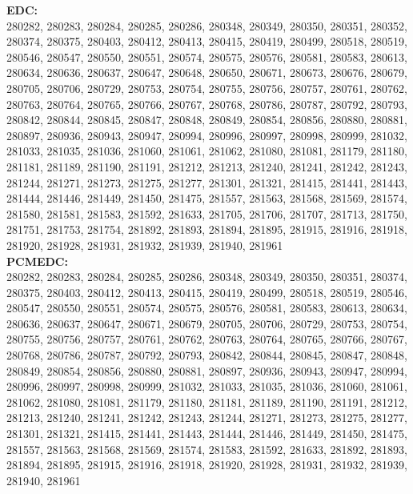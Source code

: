  \textbf{EDC:}\\
280282, 280283, 280284, 280285, 280286, 280348, 280349, 280350, 280351, 280352, 280374, 280375, 280403, 280412, 280413, 280415, 280419, 280499, 280518, 280519, 280546, 280547, 280550, 280551, 280574, 280575, 280576, 280581, 280583, 280613, 280634, 280636, 280637, 280647, 280648, 280650, 280671, 280673, 280676, 280679, 280705, 280706, 280729, 280753, 280754, 280755, 280756, 280757, 280761, 280762, 280763, 280764, 280765, 280766, 280767, 280768, 280786, 280787, 280792, 280793, 280842, 280844, 280845, 280847, 280848, 280849, 280854, 280856, 280880, 280881, 280897, 280936, 280943, 280947, 280994, 280996, 280997, 280998, 280999, 281032, 281033, 281035, 281036, 281060, 281061, 281062, 281080, 281081, 281179, 281180, 281181, 281189, 281190, 281191, 281212, 281213, 281240, 281241, 281242, 281243, 281244, 281271, 281273, 281275, 281277, 281301, 281321, 281415, 281441, 281443, 281444, 281446, 281449, 281450, 281475, 281557, 281563, 281568, 281569, 281574, 281580, 281581, 281583, 281592, 281633, 281705, 281706, 281707, 281713, 281750, 281751, 281753, 281754, 281892, 281893, 281894, 281895, 281915, 281916, 281918, 281920, 281928, 281931, 281932, 281939, 281940, 281961\\

 \textbf{PCMEDC:}\\
280282, 280283, 280284, 280285, 280286, 280348, 280349, 280350, 280351, 280374, 280375, 280403, 280412, 280413, 280415, 280419, 280499, 280518, 280519, 280546, 280547, 280550, 280551, 280574, 280575, 280576, 280581, 280583, 280613, 280634, 280636, 280637, 280647, 280671, 280679, 280705, 280706, 280729, 280753, 280754, 280755, 280756, 280757, 280761, 280762, 280763, 280764, 280765, 280766, 280767, 280768, 280786, 280787, 280792, 280793, 280842, 280844, 280845, 280847, 280848, 280849, 280854, 280856, 280880, 280881, 280897, 280936, 280943, 280947, 280994, 280996, 280997, 280998, 280999, 281032, 281033, 281035, 281036, 281060, 281061, 281062, 281080, 281081, 281179, 281180, 281181, 281189, 281190, 281191, 281212, 281213, 281240, 281241, 281242, 281243, 281244, 281271, 281273, 281275, 281277, 281301, 281321, 281415, 281441, 281443, 281444, 281446, 281449, 281450, 281475, 281557, 281563, 281568, 281569, 281574, 281583, 281592, 281633, 281892, 281893, 281894, 281895, 281915, 281916, 281918, 281920, 281928, 281931, 281932, 281939, 281940, 281961\\

